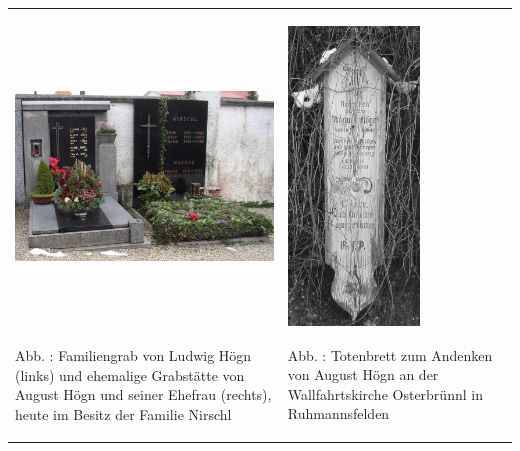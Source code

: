 \begin{flushleft}
\tablefirsthead{}
\tablehead{}
\tabletail{}
\tablelasttail{}
\begin{supertabular}{m{12.311cm}m{3.6929998cm}}

\includegraphics[width=12.129cm,height=8.015cm]{pictures/zulassungsarbeit-img057.jpg}

Abb. : Familiengrab von Ludwig Högn (links)
und ehemalige Grabstätte von August Högn und seiner Ehefrau (rechts),
heute im Besitz der Familie Nirschl &

\includegraphics[width=3.51cm,height=7.978cm]{pictures/zulassungsarbeit-img058.jpg}

Abb. : Totenbrett zum Andenken von August Högn
an der Wallfahrtskirche Osterbrünnl in Ruhmannsfelden\\
\end{supertabular}
\end{flushleft}
